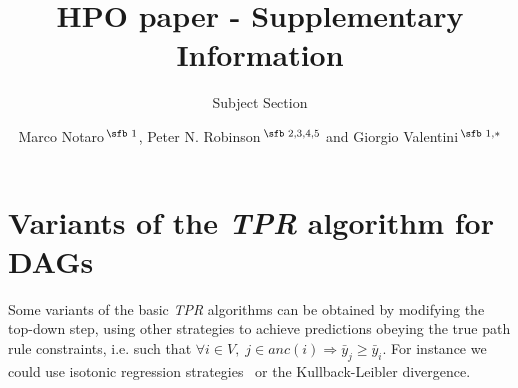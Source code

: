 \documentclass{bioinfo}
\begin{document}

\subtitle{Subject Section}



\title[short Title]{HPO paper - Supplementary Information}
\author[Sample \textit{et~al}.]{Marco Notaro\,$^{\text{\sfb 1}}$, Peter N. Robinson\,$^{\text{\sfb 2,3,4,5}}$ and Giorgio Valentini\,$^{\text{\sfb 1,}*}$}
\address{$^{\text{\sf 1}}$Anacleto Lab - Dipartimento di Informatica, Universit\'a degli Studi di Milano, Via Comelico 39, 20135 Milano, Italy \\
$^{\text{\sf 2}}$Institute for Medical and Human Genetics, Charite-Universitatsmedizin Berlin, Augustenburger Platz 1, 13353 Berlin, Germany\\
$^{\text{\sf 3}}$Max Planck Institute for Molecular Genetics, Ihnestrasse 63-73, 14195 Berlin, Germany\\
$^{\text{\sf 4}}$The Jackson Laboratory for Genomic Medicine, 10 Discovery Drive. Farmington, CT 06032, USA\\
$^{\text{\sf 5}}$Institute for Systems Genomics, University of Connecticut, Farmington, CT 06032, USA
}

\corresp{}

\corresp{}

\history{}

\editor{}


\abstract{}

\maketitle




\section{Variants of the {\em TPR} algorithm for DAGs}
\label{sec:TPR-variants}

Some variants of the basic {\em TPR} algorithms can be obtained by modifying the top-down step, using other strategies to achieve predictions obeying the true path rule constraints, i.e. such that $\forall i \in V, \;  j \in anc(i) \Rightarrow \bar{y}_j \geq \bar{y}_i$. 
For instance we could use isotonic regression strategies~\citep{Barlow72} or the Kullback-Leibler divergence.  
\end{document}
